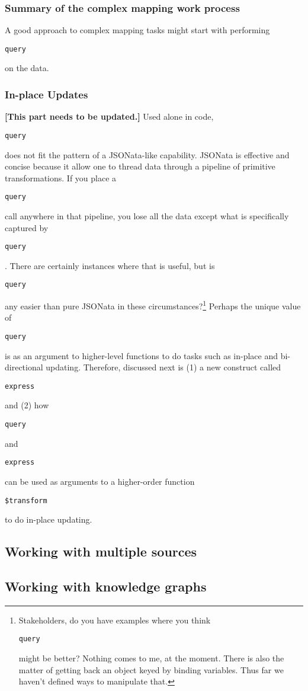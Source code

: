\documentclass[9pt,letterpaper]{article}
\newcommand{\stt}[1]{\begin{footnotesize}\texttt{#1}\end{footnotesize}}
\begin{document}
\subsubsection{Summary of the complex mapping work process}
A good approach to complex mapping tasks might start with performing \stt{query} on the data.


\subsubsection{In-place Updates}

\textbf{[This part needs to be updated.]} Used alone in code, \stt{query} does not fit the pattern of a JSONata-like capability.
JSONata is effective and concise because it allow one to thread data through a pipeline of primitive transformations.
If you place a \stt{query} call anywhere in that pipeline, you lose all the data except what is specifically captured by \stt{query}.
There are certainly instances where that is useful, but is \stt{query} any easier than pure JSONata in these circumstances?\footnote{Stakeholders, do you have
  examples where you think \stt{query} might be better?
  Nothing comes to me, at the moment.
  There is also the matter of getting back an object keyed by binding variables.
  Thus far we haven't defined ways to manipulate that.}
Perhaps the unique value of \stt{query} is as an argument to higher-level functions to do tasks such as in-place and bi-directional updating.
Therefore, discussed next is (1) a new construct called \stt{express} and (2) how \stt{query} and \stt{express} can be used as arguments to a higher-order function \stt{\$transform} to do in-place updating.

\subsection{Working with multiple sources}

\subsection{Working with knowledge graphs}
\end{document}
